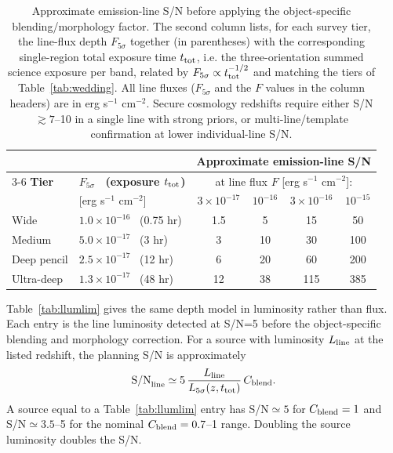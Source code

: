 \begin{table}[htbp]
\centering
\sffamily\small
\begin{tabularx}{\textwidth}{@{}p{2.3cm}p{3.3cm}c c c c@{}}
\toprule
 & & \multicolumn{4}{c}{\textbf{Approximate emission-line S/N}}\\
\cmidrule(lr){3-6}
\textbf{Tier} & \textbf{$F_{5\sigma}$ \ (exposure $t_{\rm tot}$)} & \multicolumn{4}{c}{at line flux $F$ [erg s$^{-1}$ cm$^{-2}$]:}\\
 & [erg s$^{-1}$ cm$^{-2}$] & $3\times10^{-17}$ & $10^{-16}$ & $3\times10^{-16}$ & $10^{-15}$\\
\midrule
Wide & $1.0\times10^{-16}$ \ (0.75 hr) & 1.5 & 5 & 15 & 50\\
Medium & $5.0\times10^{-17}$ \ (3 hr) & 3 & 10 & 30 & 100\\
Deep pencil & $2.5\times10^{-17}$ \ (12 hr) & 6 & 20 & 60 & 200\\
Ultra-deep & $1.3\times10^{-17}$ \ (48 hr) & 12 & 38 & 115 & 385\\
\bottomrule
\end{tabularx}
\caption{Approximate emission-line S/N before applying the object-specific blending/morphology factor. The second column lists, for each survey tier, the line-flux depth $F_{5\sigma}$ together (in parentheses) with the corresponding single-region total exposure time $t_{\rm tot}$, i.e. the three-orientation summed science exposure per band, related by $F_{5\sigma}\propto t_{\rm tot}^{-1/2}$ and matching the tiers of Table~\ref{tab:wedding}. All line fluxes ($F_{5\sigma}$ and the $F$ values in the column headers) are in erg s$^{-1}$ cm$^{-2}$. Secure cosmology redshifts require either S/N $\gtrsim7$--10 in a single line with strong priors, or multi-line/template confirmation at lower individual-line S/N.}
\label{tab:snrelg}
\end{table}

Table~\ref{tab:llumlim} gives the same depth model in luminosity rather than flux. Each entry is the line luminosity detected at S/N=5 before the object-specific blending and morphology correction. For a source with luminosity $L_{\rm line}$ at the listed redshift, the planning S/N is approximately
\begin{equation}
  {\rm S/N}_{\rm line}\simeq
  5\,\frac{L_{\rm line}}{L_{5\sigma}(z,t_{\rm tot})}\,C_{\rm blend}.
\end{equation}
A source equal to a Table~\ref{tab:llumlim} entry has S/N$\simeq5$ for $C_{\rm blend}=1$ and S/N$\simeq3.5$--5 for the nominal $C_{\rm blend}=0.7$--1 range. Doubling the source luminosity doubles the S/N.

